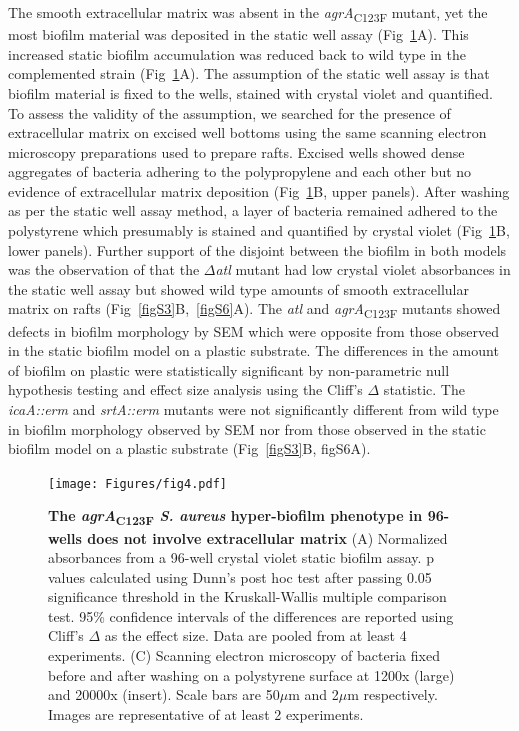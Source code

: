 \documentclass[10pt,letterpaper]{article}
\begin{document}
The smooth extracellular matrix was absent in the \textit{agrA}\textsubscript{C123F} mutant, yet the most biofilm material was deposited in the static well assay (Fig~\ref{fig4}A).
This increased static biofilm accumulation was reduced back to wild type in the complemented strain (Fig~\ref{fig4}A).
The assumption of the static well assay is that biofilm material is fixed to the wells, stained with crystal violet and quantified.
To assess the validity of the assumption, we searched for the presence of extracellular matrix on excised well bottoms using the same scanning electron microscopy preparations used to prepare rafts.
Excised wells showed dense aggregates of bacteria adhering to the polypropylene and each other but no evidence of extracellular matrix deposition (Fig~\ref{fig4}B, upper panels).
After washing as per the static well assay method, a layer of bacteria remained adhered to the polystyrene which presumably is stained and quantified by crystal violet (Fig~\ref{fig4}B, lower panels).
Further support of the disjoint between the biofilm in both models was the observation of that the $\Delta$\textit{atl} mutant had low crystal violet absorbances in the static well assay but showed wild type amounts of smooth extracellular matrix on rafts (Fig~\ref{figS3}B,~\ref{figS6}A).
The \textit{atl} and \textit{agrA}\textsubscript{C123F} mutants showed defects in biofilm morphology by SEM which were opposite from those observed in the static biofilm model on a plastic substrate.
The differences in the amount of biofilm on plastic were statistically significant by non-parametric null hypothesis testing and effect size analysis using the Cliff's $\Delta$ statistic.
The \textit{icaA::erm} and \textit{srtA::erm} mutants were not significantly different from wild type in biofilm morphology observed by SEM nor from those observed in the static biofilm model on a plastic substrate (Fig~\ref{figS3}B, {figS6}A).


\begin{figure}[!ht]
\begin{adjustwidth}{-2.25in}{0in}
\texttt{[image: Figures/fig4.pdf]}
\caption[The \textit{agrA}\textsubscript{C123F} \textit{S. aureus} hyper-biofilm phenotype in 96-wells does not involve extracellular matrix]{
	\textbf{The \textit{agrA}\textsubscript{C123F} \textit{S. aureus} hyper-biofilm phenotype in 96-wells does not involve extracellular matrix}
	(A) Normalized absorbances from a 96-well crystal violet static biofilm assay. p values calculated using Dunn's post hoc test after passing 0.05 significance threshold in the Kruskall-Wallis multiple comparison test. 95\% confidence intervals of the differences are reported using Cliff's $\Delta$ as the effect size. Data are pooled from at least 4 experiments.
	(C) Scanning electron microscopy of bacteria fixed before and after washing on a polystyrene surface at 1200x (large) and 20000x (insert). Scale bars are 50$\mu$m and 2$\mu$m respectively. Images are representative of at least 2 experiments.}
    \label{fig4}
    \end{adjustwidth}
\end{figure}
\end{document}
